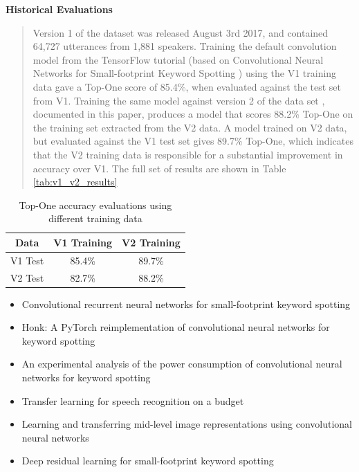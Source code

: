 \documentclass{article}
\theoremstyle{definition}
\theoremstyle{remark}
\begin{document}
\textbf{Historical Evaluations}

\begin{quote}
Version 1 of the dataset \cite{scd_v1} was released August 3rd 2017, and contained 64,727 utterances from 1,881 speakers. Training the default convolution model from the TensorFlow tutorial (based on Convolutional Neural Networks for Small-footprint Keyword Spotting \cite{sainath2015convolutional}) using the V1 training data gave a Top-One score of 85.4\%, when evaluated against the test set from V1. Training the same model against version 2 of the data set \cite{scd_v2}, documented in this paper, produces a model that scores 88.2\% Top-One on the training set extracted from the V2 data. A model trained on V2 data, but evaluated against the V1 test set gives 89.7\% Top-One, which indicates that the V2 training data is responsible for a substantial improvement in accuracy over V1. The full set of results are shown in Table \ref{tab:v1_v2_results}
\end{quote}


\begin{table}[]
\center
\begin{tabular}{|c|c|c|}
\hline
Data & V1 Training & V2 Training \\ \hline
V1 Test & 85.4\% & 89.7\% \\ \hline
V2 Test & 82.7\% & 88.2\% \\ \hline
\end{tabular}
\caption{Top-One accuracy evaluations using different training data}
\label{tab:top_one_accuracy}
\end{table}




\begin{itemize}
	\item Convolutional recurrent neural networks for small-footprint keyword spotting \cite{arik2017convolutional}
	\item Honk: A PyTorch reimplementation of convolutional neural networks for keyword spotting \cite{tang2017honk}
	\item An experimental analysis of the power consumption of convolutional neural networks for keyword spotting \cite{tang2018experimental}
	\item Transfer learning for speech recognition on a budget \cite{kunze2017transfer}
	\item Learning and transferring mid-level image representations using convolutional neural networks \cite{oquab2014learning}
	\item Deep residual learning for small-footprint keyword spotting \cite{tang2018deep}
\end{itemize}
\end{document}
